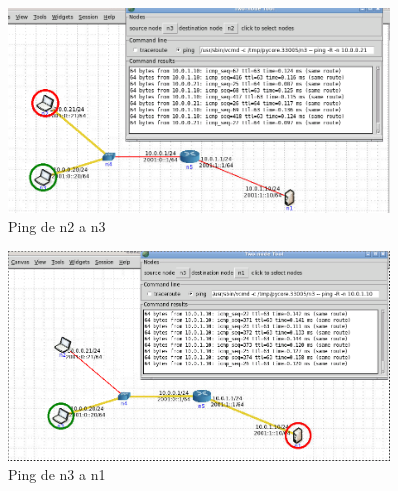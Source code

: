 \begin{figure}[!ht]
   \centering
   \includegraphics[width=0.9\textwidth]{img/ping-n2-n3}
   \caption{Ping de n2 a n3}
   \centering
   \label{label:file_name}
\end{figure}

\begin{figure}[!ht]
   \centering
   \includegraphics[width=0.9\textwidth]{img/ping-n3-n1}
   \caption{Ping de n3 a n1}
   \centering
   \label{label:file_name}
\end{figure}
\pagebreak


\newpage
\printbibliography






